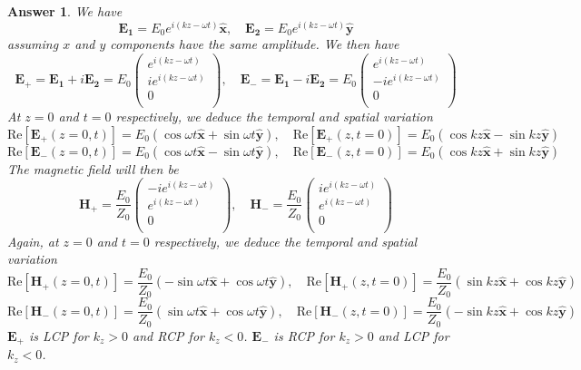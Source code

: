 \documentclass[a4paper]{article}
\newtheorem{ans}{Answer}[section]
\theoremstyle{new}
\begin{document}
\begin{ans}
We have
$$\mathbf{E_1}=E_0e^{i(kz-\omega t)}\mathbf{\hat{x}},\quad\mathbf{E_2}=E_0e^{i(kz-\omega t)}\mathbf{\hat{y}}$$
assuming $x$ and $y$ components have the same amplitude. We then have
$$\mathbf{E_+}=\mathbf{E_1}+i\mathbf{E_2}=E_0\begin{pmatrix}e^{i(kz-\omega t)}\\ie^{i(kz-\omega t)}\\0\\\end{pmatrix},\quad\mathbf{E_-}=\mathbf{E_1}-i\mathbf{E_2}=E_0\begin{pmatrix}e^{i(kz-\omega t)}\\-ie^{i(kz-\omega t)}\\0\\\end{pmatrix}$$
At $z=0$ and $t=0$ respectively, we deduce the temporal and spatial variation
$$\text{Re}[\mathbf{E_+}(z=0,t)]=E_0(\cos\omega t\mathbf{\hat{x}}+\sin\omega t\mathbf{\hat{y}}),\quad\text{Re}[\mathbf{E_+}(z,t=0)]=E_0(\cos kz\mathbf{\hat{x}}-\sin kz\mathbf{\hat{y}})$$
$$\text{Re}[\mathbf{E_-}(z=0,t)]=E_0(\cos\omega t\mathbf{\hat{x}}-\sin\omega t\mathbf{\hat{y}}),\quad\text{Re}[\mathbf{E_-}(z,t=0)]=E_0(\cos kz\mathbf{\hat{x}}+\sin kz\mathbf{\hat{y}})$$
The magnetic field will then be
$$\mathbf{H_+}=\frac{E_0}{Z_0}\begin{pmatrix}-ie^{i(kz-\omega t)}\\e^{i(kz-\omega t)}\\0\\\end{pmatrix},\quad\mathbf{H_-}=\frac{E_0}{Z_0}\begin{pmatrix}ie^{i(kz-\omega t)}\\e^{i(kz-\omega t)}\\0\\\end{pmatrix}$$
Again, at $z=0$ and $t=0$ respectively, we deduce the temporal and spatial variation
$$\text{Re}[\mathbf{H_+}(z=0,t)]=\frac{E_0}{Z_0}(-\sin\omega t\mathbf{\hat{x}}+\cos\omega t\mathbf{\hat{y}}),\quad\text{Re}[\mathbf{H_+}(z,t=0)]=\frac{E_0}{Z_0}(\sin kz\mathbf{\hat{x}}+\cos kz\mathbf{\hat{y}})$$
$$\text{Re}[\mathbf{H_-}(z=0,t)]=\frac{E_0}{Z_0}(\sin\omega t\mathbf{\hat{x}}+\cos\omega t\mathbf{\hat{y}}),\quad\text{Re}[\mathbf{H_-}(z,t=0)]=\frac{E_0}{Z_0}(-\sin kz\mathbf{\hat{x}}+\cos kz\mathbf{\hat{y}})$$
$\mathbf{E_+}$ is LCP for $k_z>0$ and RCP for $k_z<0$. $\mathbf{E_-}$ is RCP for $k_z>0$ and LCP for $k_z<0$.
\end{ans}
\end{document}

